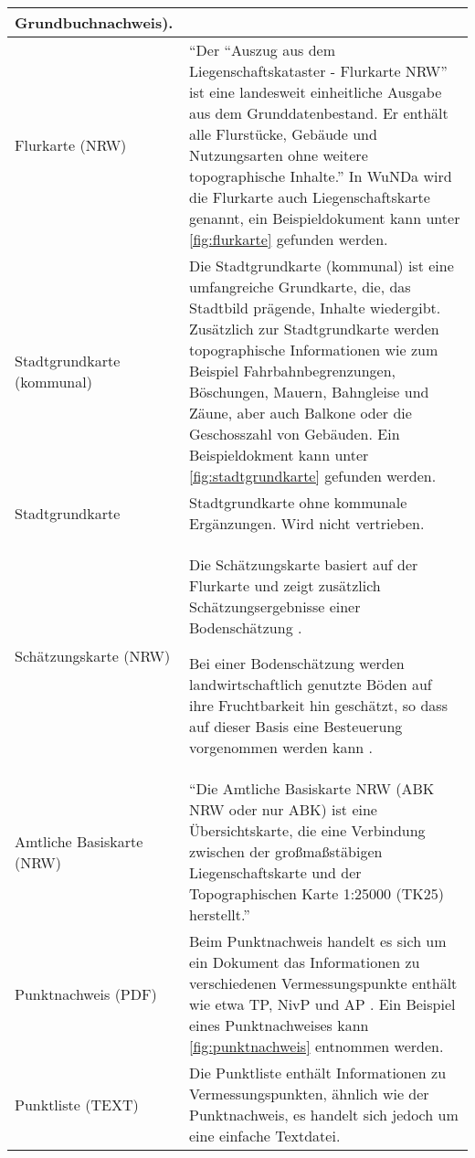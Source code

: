 \begin{longtable}{|p{}|p{}|}
{	Grundbuchnachweis).} \autocite[269]{adv-alkis-erlaeuterung}\\
	\hline
	Flurkarte (NRW)
	&
	\enquote{Der "`Auszug aus dem Liegenschaftskataster - Flurkarte NRW"'  ist eine landesweit einheitliche Ausgabe aus dem Grunddatenbestand. Er enthält alle Flurstücke, Gebäude und Nutzungsarten ohne weitere topographische Inhalte.} \autocite{wupp-alkis} In \acs{WuNDa} wird die Flurkarte auch Liegenschaftskarte genannt, ein Beispieldokument kann unter \ref{fig:flurkarte} gefunden werden.\\
	\hline
	Stadtgrundkarte (kommunal)
	&
Die Stadtgrundkarte (kommunal) ist eine umfangreiche Grundkarte, die, das Stadtbild prägende, Inhalte wiedergibt. Zusätzlich zur Stadtgrundkarte werden topographische Informationen wie zum Beispiel 
Fahrbahnbegrenzungen, Böschungen, Mauern, Bahngleise und Zäune, aber auch Balkone oder die Geschosszahl von Gebäuden.	
 \autocite[vgl.][]{wupp-alkis} Ein Beispieldokment kann unter \vref{fig:stadtgrundkarte} gefunden werden. \\
	\hline			
	Stadtgrundkarte
	&
	Stadtgrundkarte ohne kommunale Ergänzungen. Wird nicht vertrieben. \\
	\hline
	Schätzungskarte (NRW)
	&
	Die Schätzungskarte basiert auf der Flurkarte und zeigt zusätzlich Schätzungsergebnisse einer Bodenschätzung \autocite[vgl.][]{gg-schaetzungskarte}. 
	
	Bei einer Bodenschätzung werden landwirtschaftlich genutzte Böden auf ihre Fruchtbarkeit hin geschätzt, so dass auf dieser Basis eine Besteuerung vorgenommen werden kann \autocite[vgl.][]{sachsen-boden}.   \\
						
	\hline
	Amtliche Basiskarte (NRW)
	&
	\enquote{Die Amtliche Basiskarte NRW (ABK NRW oder nur ABK) ist eine Übersichtskarte, die eine Verbindung zwischen der großmaßstäbigen Liegenschaftskarte und der Topographischen Karte 1:25000 (TK25) herstellt.} \todo{quelle:(wikipedia)} \\
	\hline
	Punktnachweis (PDF)
	&
	Beim Punktnachweis handelt es sich um ein Dokument das Informationen zu verschiedenen Vermessungspunkte enthält wie etwa \ac{TP}, \ac{NivP} und \ac{AP} \autocite[vgl.][]{innen-punkte}. Ein Beispiel eines Punktnachweises kann \ref{fig:punktnachweis} entnommen werden.	 \\
	\hline
	Punktliste (TEXT)
	&
	Die Punktliste enthält Informationen zu Vermessungspunkten, ähnlich wie der Punktnachweis, es handelt sich jedoch um eine einfache Textdatei. \\
	\hline
\end{longtable} 
\label{tab-alkis-standard-end}
	
